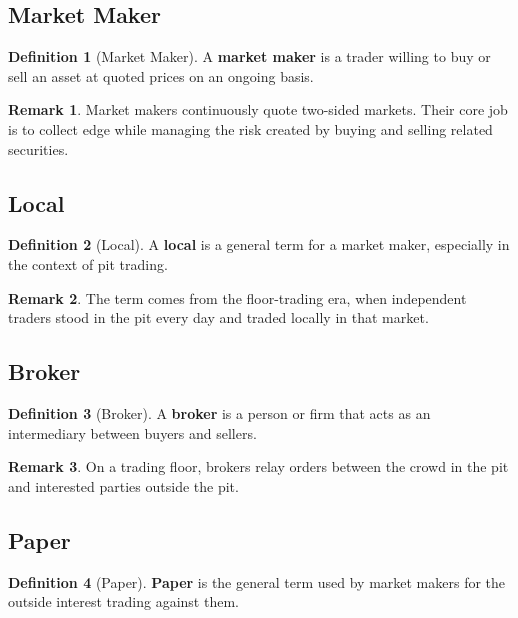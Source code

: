 \documentclass[11pt]{article}
\theoremstyle{definition}
\newtheorem{definition}{Definition}[section]
\newtheorem{remark}{Remark}[section]
\begin{document}
\subsection{Market Maker}

\begin{definition}[Market Maker]
A \textbf{market maker} is a trader willing to buy or sell an asset at quoted prices on an ongoing basis.
\end{definition}

\begin{remark}
Market makers continuously quote two-sided markets. Their core job is to collect edge while managing the risk created by buying and selling related securities.
\end{remark}

\subsection{Local}

\begin{definition}[Local]
A \textbf{local} is a general term for a market maker, especially in the context of pit trading.
\end{definition}

\begin{remark}
The term comes from the floor-trading era, when independent traders stood in the pit every day and traded locally in that market.
\end{remark}

\subsection{Broker}

\begin{definition}[Broker]
A \textbf{broker} is a person or firm that acts as an intermediary between buyers and sellers.
\end{definition}

\begin{remark}
On a trading floor, brokers relay orders between the crowd in the pit and interested parties outside the pit.
\end{remark}

\subsection{Paper}

\begin{definition}[Paper]
\textbf{Paper} is the general term used by market makers for the outside interest trading against them.
\end{definition}
\end{document}
